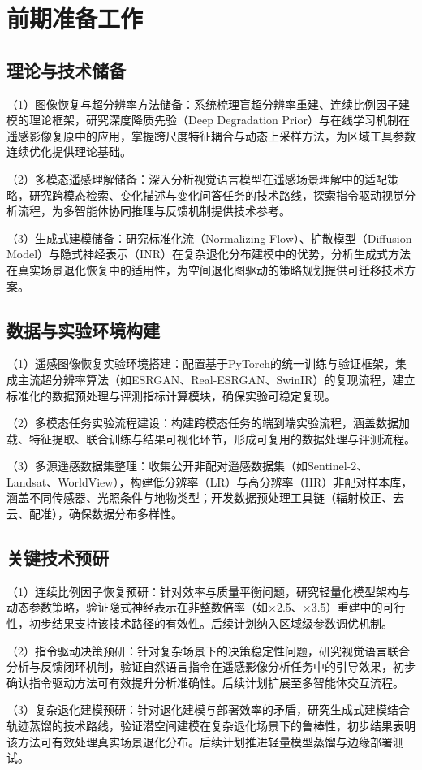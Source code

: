\section{前期准备工作}

\subsection{理论与技术储备}

（1）图像恢复与超分辨率方法储备：系统梳理盲超分辨率重建、连续比例因子建模的理论框架，研究深度降质先验（Deep Degradation Prior）与在线学习机制在遥感影像复原中的应用，掌握跨尺度特征耦合与动态上采样方法，为区域工具参数连续优化提供理论基础。

（2）多模态遥感理解储备：深入分析视觉语言模型在遥感场景理解中的适配策略，研究跨模态检索、变化描述与变化问答任务的技术路线，探索指令驱动视觉分析流程，为多智能体协同推理与反馈机制提供技术参考。

（3）生成式建模储备：研究标准化流（Normalizing Flow）、扩散模型（Diffusion Model）与隐式神经表示（INR）在复杂退化分布建模中的优势，分析生成式方法在真实场景退化恢复中的适用性，为空间退化图驱动的策略规划提供可迁移技术方案。

\subsection{数据与实验环境构建}

（1）遥感图像恢复实验环境搭建：配置基于PyTorch的统一训练与验证框架，集成主流超分辨率算法（如ESRGAN、Real-ESRGAN、SwinIR）的复现流程，建立标准化的数据预处理与评测指标计算模块，确保实验可稳定复现。

（2）多模态任务实验流程建设：构建跨模态任务的端到端实验流程，涵盖数据加载、特征提取、联合训练与结果可视化环节，形成可复用的数据处理与评测流程。

（3）多源遥感数据集整理：收集公开非配对遥感数据集（如Sentinel-2、Landsat、WorldView），构建低分辨率（LR）与高分辨率（HR）非配对样本库，涵盖不同传感器、光照条件与地物类型；开发数据预处理工具链（辐射校正、去云、配准），确保数据分布多样性。

\subsection{关键技术预研}

（1）连续比例因子恢复预研：针对效率与质量平衡问题，研究轻量化模型架构与动态参数策略，验证隐式神经表示在非整数倍率（如$\times$2.5、$\times$3.5）重建中的可行性，初步结果支持该技术路径的有效性。后续计划纳入区域级参数调优机制。

（2）指令驱动决策预研：针对复杂场景下的决策稳定性问题，研究视觉语言联合分析与反馈闭环机制，验证自然语言指令在遥感影像分析任务中的引导效果，初步确认指令驱动方法可有效提升分析准确性。后续计划扩展至多智能体交互流程。

（3）复杂退化建模预研：针对退化建模与部署效率的矛盾，研究生成式建模结合轨迹蒸馏的技术路线，验证潜空间建模在复杂退化场景下的鲁棒性，初步结果表明该方法可有效处理真实场景退化分布。后续计划推进轻量模型蒸馏与边缘部署测试。
